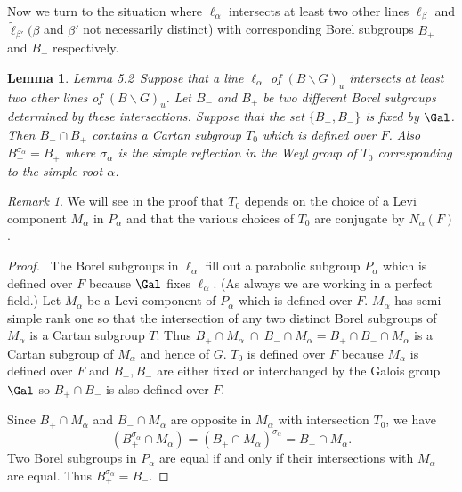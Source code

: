 \documentclass{memo-l}
\newtheorem{lemma}[theorem]{Lemma}
\theoremstyle{definition}
\theoremstyle{remark}
\newtheorem*{remark*}{Remark} %
\numberwithin{section}{chapter}
\numberwithin{equation}{chapter}
\begin{document}
{\medskip}

   Now we turn to the situation where ${\ell}_{{\alpha}}$ intersects at
least two other lines ${\ell}_{{\beta}}$ and $\tilde{\ell} _{{\beta}'}
({\beta}$ and ${\beta}'$ not necessarily distinct) with corresponding Borel
subgroups $B_{+}$ and $B_{-}$ respectively.

\medpagebreak

\begin{lemma}{Lemma 5.2}\ Suppose that a line ${\ell}_{{\alpha}}$ of
$(B\backslash G)_{u}$ intersects at least two other lines of $(B\backslash
G)_{u}$.  Let $B_{-}$ and $B_{+}$ be two different Borel subgroups
determined by these intersections.  Suppose that the set $\{B_{+},B_{-}\}$
is fixed by $\Gal$.  Then $B_{-} \cap B_{+}$ contains a Cartan
subgroup $T_{0}$ which is defined over $F$.  Also $B_-^{\sigma_\alpha} =
B_{+}$ where ${\sigma}_{{\alpha}}$ is the simple
reflection in the Weyl group of $T_{0}$ corresponding to the simple root
${\alpha}$.
\end{lemma}

\begin{remark*} %
We will see in the proof that $T_{0}$ depends on the
choice of a Levi component $M_{{\alpha}}$ in $P_{{\alpha}}$ and that the
various choices of $T_{0}$ are conjugate by $N_{{\alpha}}(F)$.
\end{remark*}


\begin{proof} \ The Borel subgroups in ${\ell}_{{\alpha}}$ fill out a
parabolic subgroup $P_{{\alpha}}$ which is defined over $F$ because
$\Gal$ fixes ${\ell}_{{\alpha}}$.  (As always we are working in a
perfect field.) Let $M_{{\alpha}}$ be a Levi component of $P_{{\alpha}}$
which is defined over $F$.  $M_{{\alpha}}$ has semi-simple rank one so that
the intersection of any two distinct Borel subgroups of $M_{{\alpha}}$ is a
Cartan subgroup $T$.  Thus $B_{+}\cap M_{{\alpha}} \ \cap\
B_{-}\cap M_{{\alpha}} = B_{+}\cap B_{-} \cap M_{{\alpha}}$ is a Cartan
subgroup of $M_{{\alpha}}$ and hence of $G$.  $T_{0}$ is defined over $F$
because $M_{{\alpha}}$ is defined over $F$ and $B_{+},B_{-}$ are either
fixed or interchanged by the Galois group $\Gal$ so
$B_{+} \cap B_{-}$ is also defined over $F$.

   Since $B_{+} \cap M_{{\alpha}}$ and $B_{-} \cap M_{{\alpha}}$ are
opposite in $M_{{\alpha}}$ with intersection $T_{0}$, we have
$$(B_{+}^{{\sigma}_{{\alpha}}}  \cap  M_{{\alpha}}) = (B_{+}  \cap
M_{{\alpha}})^{{\sigma}_{{\alpha}}} = B_{-}  \cap  M_{{\alpha}}.$$  Two Borel subgroups
in $P_{{\alpha}}$ are equal if and only if their intersections with
$M_{{\alpha}}$ are equal.  Thus $B_{+}^{{\sigma}_{{\alpha}}} =
B_{-}$.
\end{proof}
\end{document}
